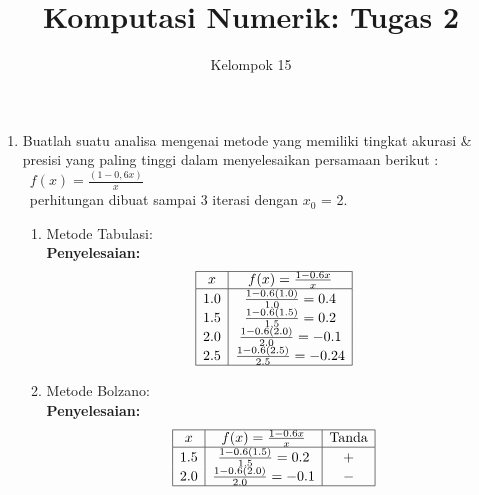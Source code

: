 \documentclass{article}
\title{\textbf{Komputasi Numerik: Tugas 2}}
\author{Kelompok 15}
\date{}
\newcommand{\penyelesaian}{\textbf{Penyelesaian: }}
\begin{document}
\maketitle

\begin{enumerate}
    \item Buatlah suatu analisa mengenai metode yang memiliki tingkat akurasi \& presisi yang paling tinggi dalam menyelesaikan persamaan berikut : \\
    \ $f(x) = \frac{(1 - 0,6x)}{x}$ \\
    \ perhitungan dibuat sampai 3 iterasi dengan $x_0$ = 2.
    \begin{enumerate}
        \item Metode Tabulasi: \\
        \penyelesaian   \[
                        \begin{array}{|c|c|}
                        \hline
                        x & f(x) = \frac{1 - 0.6x}{x} \\
                        \hline
                        1.0 & \frac{1 - 0.6(1.0)}{1.0} = 0.4 \\
                        1.5 & \frac{1 - 0.6(1.5)}{1.5} = 0.2 \\
                        2.0 & \frac{1 - 0.6(2.0)}{2.0} = -0.1 \\
                        2.5 & \frac{1 - 0.6(2.5)}{2.5} = -0.24 \\
                        \hline
                        \end{array}
                        \]

        \item Metode Bolzano: \\
        \penyelesaian   \[
                        \begin{array}{|c|c|c|}
                        \hline
                        x & f(x) = \frac{1 - 0.6x}{x} & \text{Tanda} \\
                        \hline
                        1.5 & \frac{1 - 0.6(1.5)}{1.5} = 0.2 & + \\
                        2.0 & \frac{1 - 0.6(2.0)}{2.0} = -0.1 & - \\
                        \hline
                        \end{array}
                        \]


\end{enumerate}
\end{enumerate}
\end{document}
